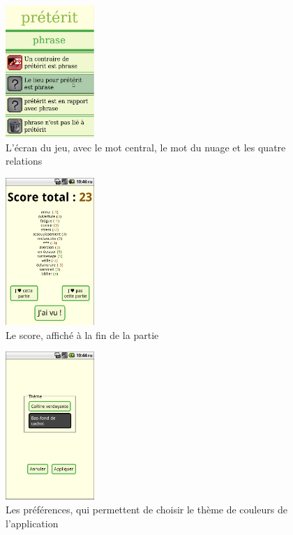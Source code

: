 \documentclass[a4paper,11pt,french]{article}
\begin{document}
\begin{figure}[h!]
  \centering
      \includegraphics[width=0.3\textwidth]{img/preterit02.jpg}
  \caption{L'écran du jeu, avec le mot central, le mot du nuage et les quatre relations}
\end{figure}

\begin{figure}[h!]
  \centering
      \includegraphics[width=0.3\textwidth]{img/phone-score.png}
  \caption{Le score, affiché à la fin de la partie}
\end{figure}

\begin{figure}[h!]
  \centering
      \includegraphics[width=0.3\textwidth]{img/phone-preferences.png}
  \caption{Les préférences, qui permettent de choisir le thème de couleurs de l'application}
\end{figure}
\end{document}
